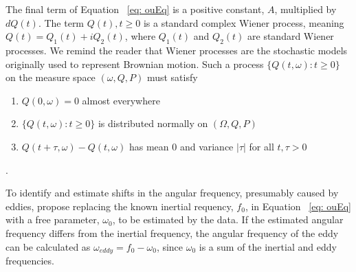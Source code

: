 \documentclass{stat572Style}
\begin{document}
 The final term of Equation ~\ref{eq: ouEq} is a positive constant, $A$, multiplied by $dQ(t)$.  The term $Q(t), t \geq 0$ is a standard complex Wiener process,  meaning $Q(t) = Q_{1}(t) + i Q_{2}(t)$, where $Q_{1}(t)$ and $Q_{2}(t)$ are standard Wiener processes.
 We remind the reader that Wiener processes are the stochastic models originally used to represent Brownian motion. 
  Such a process $\{Q(t, \omega): t \geq 0\}$ on the measure space $(\omega, Q, P)$ must satisfy
\begin{enumerate}
\item $Q(0, \omega) = 0$ almost everywhere
\item $\{Q(t, \omega): t \geq 0\}$ is distributed normally on $(\Omega,Q, P)$
\item $Q(t + \tau, \omega) - Q(t, \omega)$ has mean 0 and variance $|\tau|$ for all $t, \tau > 0$
\end{enumerate}
\citep{Hida1980}. 

To identify and estimate shifts in the angular frequency, presumably caused by eddies, \citet{Sykulski2016} propose replacing the known inertial requency, $f_{0}$,  in Equation ~\ref{eq: ouEq} with  a free parameter, $\omega_{0}$, to be estimated by the data. 
If the estimated angular frequency differs from the inertial frequency, the angular frequency of the eddy can be calculated as $\omega_{eddy} = f_{0} - \omega_{0}$, since $\omega_{0}$ is a sum of the inertial and eddy frequencies.
\end{document}
